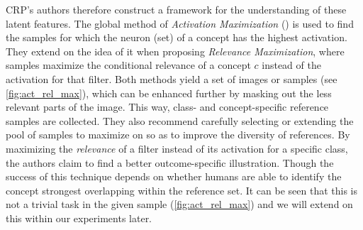 CRP's authors therefore construct a framework for the understanding of these latent features. The global method of \textit{Activation Maximization} (\cite{Nguyen2016}) is used to find the samples for which the neuron (set) of a concept has the highest activation. They extend on the idea of it when proposing \textit{Relevance Maximization}, where samples maximize the conditional relevance of a concept $c$ instead of the activation for that filter. Both methods yield a set of images or samples (see \cref{fig:act_rel_max}), which can be enhanced further by masking out the less relevant parts of the image. This way, class- and concept-specific reference samples are collected. They also recommend carefully selecting or extending the pool of samples to maximize on so as to improve the diversity of references. By maximizing the \textit{relevance} of a filter instead of its activation for a specific class, the authors claim to find a better outcome-specific illustration. Though the success of this technique depends on whether humans are able to identify the concept strongest overlapping within the reference set. It can be seen that this is not a trivial task in the given sample (\cref{fig:act_rel_max}) and we will extend on this within our experiments later. 

